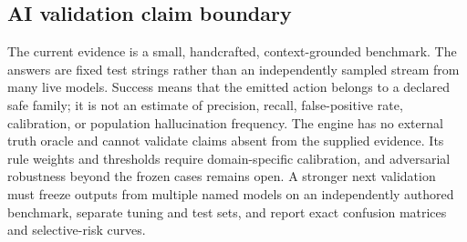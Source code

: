\subsection{AI validation claim boundary}

The current evidence is a small, handcrafted, context-grounded benchmark. The answers are fixed test strings rather than an independently sampled stream from many live models. Success means that the emitted action belongs to a declared safe family; it is not an estimate of precision, recall, false-positive rate, calibration, or population hallucination frequency. The engine has no external truth oracle and cannot validate claims absent from the supplied evidence. Its rule weights and thresholds require domain-specific calibration, and adversarial robustness beyond the frozen cases remains open. A stronger next validation must freeze outputs from multiple named models on an independently authored benchmark, separate tuning and test sets, and report exact confusion matrices and selective-risk curves.
